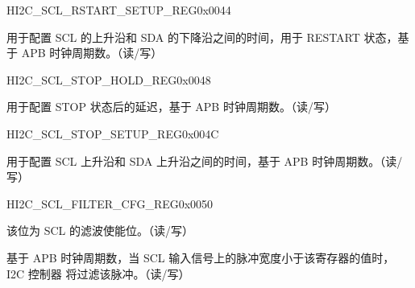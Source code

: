 \documentclass[main.tex]{subfiles}
\begin{document}
\begin{register}{H}{I2C\_SCL\_RSTART\_SETUP\_REG}{0x0044}\label{regdesc:I2CSCLRSTARTSETUPREG}
%
%
\regnewline%
\begin{regdesc}\begin{reglist}
\item [I2C\_SCL\_RSTART\_SETUP\_TIME] 用于配置 SCL 的上升沿和 SDA 的下降沿之间的时间，用于 RESTART 状态，基于 APB 时钟周期数。（读/写）
\end{reglist}\end{regdesc}
\end{register}


\begin{register}{H}{I2C\_SCL\_STOP\_HOLD\_REG}{0x0048}\label{regdesc:I2CSCLSTOPHOLDREG}
%
%
\regnewline%
\begin{regdesc}\begin{reglist}
\item [I2C\_SCL\_STOP\_HOLD\_TIME] 用于配置 STOP 状态后的延迟，基于 APB 时钟周期数。（读/写）
\end{reglist}\end{regdesc}
\end{register}


\begin{register}{H}{I2C\_SCL\_STOP\_SETUP\_REG}{0x004C}\label{regdesc:I2CSCLSTOPSETUPREG}
%
%
\regnewline%
\begin{regdesc}\begin{reglist}
\item [I2C\_SCL\_STOP\_SETUP\_TIME] 用于配置 SCL 上升沿和 SDA 上升沿之间的时间，基于 APB 时钟周期数。（读/写）
\end{reglist}\end{regdesc}
\end{register}


\begin{register}{H}{I2C\_SCL\_FILTER\_CFG\_REG}{0x0050}\label{regdesc:I2CSCLFILTERCFGREG}
%
%
%
\regnewline%
\begin{regdesc}\begin{reglist}
\item [I2C\_SCL\_FILTER\_EN]该位为 SCL 的滤波使能位。（读/写）
\item [I2C\_SCL\_FILTER\_THRES]基于 APB 时钟周期数，当 SCL 输入信号上的脉冲宽度小于该寄存器的值时， I2C 控制器 将过滤该脉冲。（读/写） 
\end{reglist}\end{regdesc}
\end{register}
\end{document}
